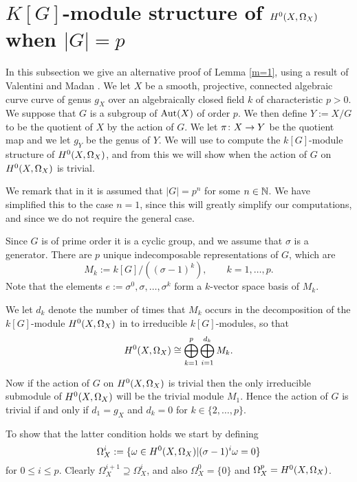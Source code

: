 \section{$K[G]$-module structure of ${H^0(X,\Omega_X)}$ when $|G|=p$}

In this subsection we give an alternative proof of Lemma \ref{m=1}, using a result of Valentini and Madan \cite{valmadan}.
We let $X$ be a smooth, projective, connected algebraic curve curve of genus $g_X$ over an algebraically closed field $k$ of characteristic $p >0$.
We suppose that $G$ is a subgroup of $\operatorname{Aut}(X)$ of order $p$.
We then define $Y:= X/G$ to be the quotient of $X$ by the action of $G$.
We let $\pi \colon X \rightarrow Y$ be the quotient map and we let $g_Y$ be the genus of $Y$.
We will use \cite[Thm.\ 1]{valmadan} to compute the $k[G]$-module structure of ${H^0(X,\Omega_X)}$, and from this we will show when the action of $G$ on ${H^0(X,\Omega_X)}$ is trivial.

We remark that in \cite{valmadan} it is assumed that $|G|=p^n$ for some $n \in {\mathbb N}$.
We have simplified this to the case $n=1$, since this will greatly simplify our computations, and since we do not require the general case.

Since $G$ is of prime order it is a cyclic group, and we assume that $\sigma$ is a generator.
There are $p$ unique indecomposable representations of $G$, which are 
    \[
    M_k := k[G]/((\sigma - 1)^k), \qquad k = 1, \ldots, p.
    \]
Note that the elements $e:= \sigma^0, \sigma, \ldots, \sigma^k$ form a $k$-vector space basis of $M_k$.

We let $d_k$ denote the number of times that $M_k$ occurs in the decomposition of the $k[G]$-module ${H^0(X,\Omega_X)}$ in to irreducible $k[G]$-modules, so that
    \begin{equation}\label{equationdecompositionofhzero}
    {H^0(X,\Omega_X)} \cong \bigoplus_{k=1}^p \bigoplus_{i=1}^{d_k} M_k.
    \end{equation}

Now if the action of $G$ on ${H^0(X,\Omega_X)}$ is trivial then the only irreducible submodule of ${H^0(X,\Omega_X)}$ will be the trivial module $M_1$.
Hence the action of $G$ is trivial if and only if $d_1 = g_X$ and $d_k = 0$ for $k \in \{ 2, \ldots, p \}$.

To show that the latter condition holds we start by defining
    \[
    \Omega_X^i := \{ \omega \in {H^0(X,\Omega_X)} | (\sigma - 1)^i\omega = 0 \}
    \]
for $0 \leq i \leq p$.
Clearly $\Omega_X^{i+1} \supseteq \Omega_X^i$, and also $\Omega_X^0 = \{0\}$ and $\Omega_X^p = {H^0(X,\Omega_X)}$.

